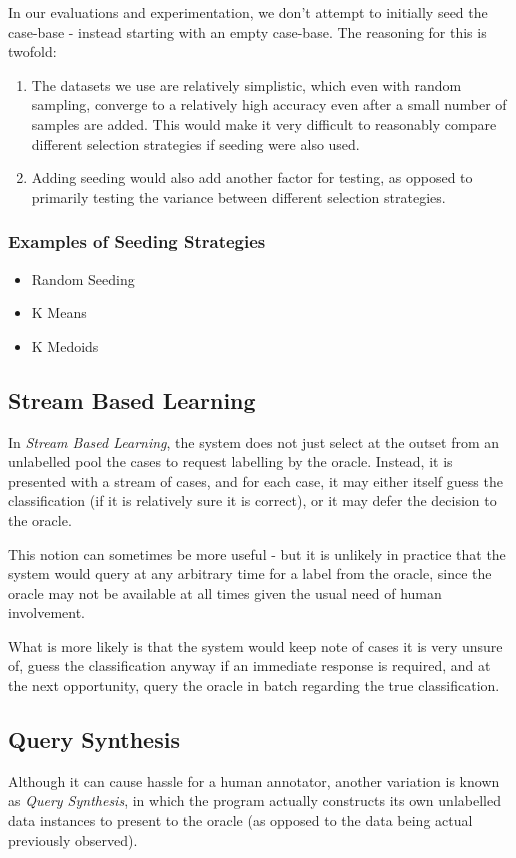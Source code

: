 \documentclass[a4paper,11pt]{report}
\begin{document}
In our evaluations and experimentation, we don't attempt to initially seed the case-base - instead starting with an empty case-base. The reasoning for this is twofold: 
\begin{enumerate}
	\item The datasets we use are relatively simplistic, which even with random sampling, converge to a relatively high accuracy even after a small number of samples are added. This would make it very difficult to reasonably compare different selection strategies if seeding were also used. 
	\item Adding seeding would also add another factor for testing, as opposed to primarily testing the variance between different selection strategies.
\end{enumerate}

\subsubsection{Examples of Seeding Strategies}
\begin{itemize}
	\item Random Seeding
	\item K Means
	\item K Medoids
\end{itemize}

\subsection{Stream Based Learning}
In \emph{Stream Based Learning}, the system does not just select at the outset from an unlabelled pool the cases to request labelling by the oracle. Instead, it is presented with a stream of cases, and for each case, it may either itself guess the classification (if it is relatively sure it is correct), or it may defer the decision to the oracle.

This notion can sometimes be more useful - but it is unlikely in practice that the system would query at any arbitrary time for a label from the oracle, since the oracle may not be available at all times given the usual need of human involvement.

What is more likely is that the system would keep note of cases it is very unsure of, guess the classification anyway if an immediate response is required, and at the next opportunity, query the oracle in batch regarding the true classification.

\subsection{Query Synthesis}
Although it can cause hassle for a human annotator, another variation is known as \emph{Query Synthesis}, in which the program actually constructs its own unlabelled data instances to present to the oracle (as opposed to the data being actual previously observed).
\end{document}
